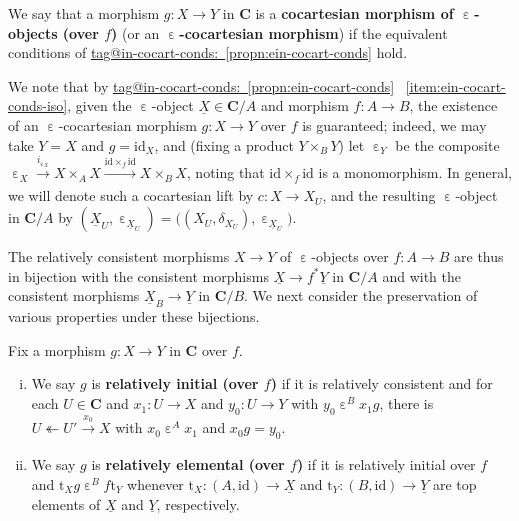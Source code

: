 \documentclass{amsart}
\makeatletter
\newcommand\bC{\mathbf{C}}
\newcommand\defword[1]{{\boldmath \textbf{#1}}}
\newcommand\ein{\mathrel{\varepsilon}}
\newcommand\id{\mathrm{id}}
\newcommand\oot{\twoheadleftarrow}
\newcommand\pbig[1]{\big({#1}\big)}
\newcommand\rt{\mathrm{t}}
\newcommand\tox[2][]{\xrightarrow[#1]{#2}}
\newcommand\und[1]{\underline{#1}}
\newcommand\unein{{\ein}}
\newcommand\tagword[1]{\csname tag@#1\endcsname}
\def\label@tag#1:#2\@nil{#1}
\newcommand\labeltag[1]{\label@tag#1:\@nil}
\newcommand\jref[1]{%
  \texorpdfstring%
    {\hyperref[#1]{\tagword{\labeltag{#1}}~\ref*{#1}}}%
    {\tagword{\labeltag{#1}}~\ref*{#1}}%
}
\theoremstyle{definition}
\theoremstyle{remark}
\theoremstyle{plainwithref}
\makeatother
\begin{document}
\begin{defn} \label{defn:ein-cocart}
  We say that a morphism \( g \colon X \to Y \) in \( \bC \) is a \defword{cocartesian morphism of \( \unein \)-objects (over \( f \))} (or an \defword{\( \unein \)-cocartesian morphism}) if the equivalent conditions of \jref{propn:ein-cocart-conds} hold.

  We note that by \jref{propn:ein-cocart-conds}~\ref{item:ein-cocart-conds-iso}, given the \( \unein \)-object \( \und X \in \bC / A \) and morphism \( f \colon A \to B \), the existence of an \( \unein \)-cocartesian morphism \( g \colon X \to Y \) over \( f \) is guaranteed; indeed, we may take \( Y = X \) and \( g = \id_X \), and (fixing a product \( Y \times_B Y \)) let \( \unein_Y \) be the composite \( \unein_X \tox{i_{\ein_X}} X \times_A X \tox{\id \times_f \id} X \times_B X \), noting that \( \id \times_f \id \) is a monomorphism.
  In general, we will denote such a cocartesian lift by \( c \colon X \to X_U \), and the resulting \( \unein \)-object in \( \bC / A \) by \( (\und X_U, \ein_{\und X_U}) = \pbig{(X_U, \delta_{X_U}), \ein_{\und X_U}} \).
\end{defn}

The relatively consistent morphisms \( X \to Y \) of \( \unein \)-objects over \( f \colon A \to B \) are thus in bijection with the consistent morphisms \( \und X \to f^* \und Y \) in \( \bC / A \) and with the consistent morphisms \( \und X_B \to \und Y  \) in \( \bC / B \).
We next consider the preservation of various properties under these bijections.
\begin{defn} \label{defn:rel-init-elem}
  Fix a morphism \( g \colon X \to Y \) in \( \bC \) over \( f \).
  \begin{enumerate}[(i)]
  \item We say \( g \) is \defword{relatively initial (over \( f \))} if it is relatively consistent and for each \( U \in \bC \) and \( x_1 \colon U \to X \) and \( y_0 \colon U \to Y \) with \( y_0 \ein^B x_1 g \), there is \( U \oot U' \tox{x_0} X \) with \( x_0 \ein^A x_1 \) and \( x_0 g = y_0 \).
  \item We say \( g \) is \defword{relatively elemental (over \( f \))} if it is relatively initial over \( f \) and \( \rt_X g \ein^B f \rt_Y \) whenever \( \rt_X \colon (A, \id) \to \und X \) and \( \rt_Y \colon (B, \id) \to \und Y \) are top elements of \( \und X \) and \( \und Y \), respectively.
  \end{enumerate}
\end{defn}
\end{document}
